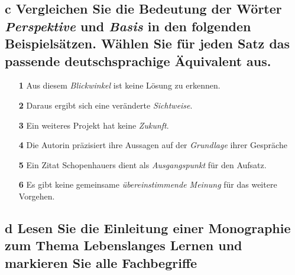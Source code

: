 \documentclass{article}
\begin{document}
	\subsection*{\textbf{c}  Vergleichen Sie die Bedeutung der Wörter \textit{Perspektive} und \textit{Basis} in den folgenden Beispielsätzen. Wählen Sie für jeden Satz das passende deutschsprachige Äquivalent aus.}
	\begin{itemize}
		\item[\textbf{1}]{Aus diesem \textit{Blickwinkel} ist keine Lösung zu erkennen.}
		\item[\textbf{2}]{Daraus ergibt sich eine veränderte \textit{Sichtweise}.}
		\item[\textbf{3}]{Ein weiteres Projekt hat keine \textit{Zukunft}.}
		\item[\textbf{4}]{Die Autorin präzisiert ihre Aussagen auf der \textit{Grundlage} ihrer Gespräche}
		\item[\textbf{5}]{Ein Zitat Schopenhauers dient als \textit{Ausgangspunkt} für den Aufsatz.}
		\item[\textbf{6}]{Es gibt keine gemeinsame \textit{übereinstimmende Meinung} für das weitere Vorgehen.}
	\end{itemize}
	\subsection*{\textbf{d}  Lesen Sie die Einleitung einer Monographie zum Thema Lebenslanges Lernen und markieren Sie alle Fachbegriffe}

	
\end{document}

